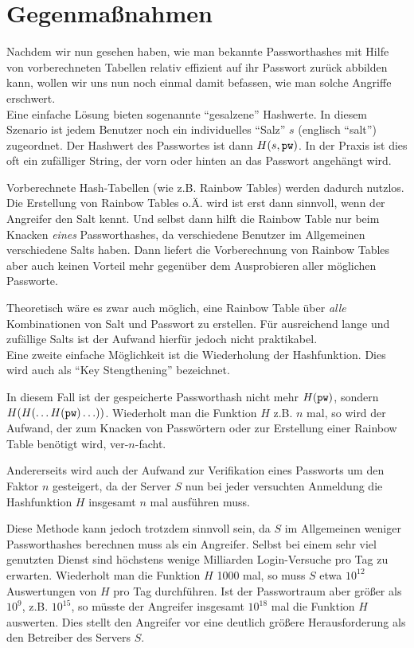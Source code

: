 \section{Gegenmaßnahmen}

Nachdem wir nun gesehen haben, wie man bekannte Passworthashes mit Hilfe von vorberechneten Tabellen relativ effizient auf ihr Passwort zurück abbilden kann, wollen wir uns nun noch einmal damit befassen, wie man solche Angriffe erschwert.\\

Eine einfache Lösung bieten sogenannte "`gesalzene"' Hashwerte. In diesem Szenario ist jedem Benutzer noch ein individuelles "`Salz"' $s$ (englisch "`salt"') zugeordnet. Der Hashwert des Passwortes ist dann $H(s, \texttt{pw})$. In der Praxis ist dies oft ein zufälliger String, der vorn oder hinten an das Passwort angehängt wird.

Vorberechnete Hash-Tabellen (wie z.B. Rainbow Tables) werden dadurch nutzlos. Die Erstellung von Rainbow Tables o.Ä. wird ist erst dann sinnvoll, wenn der Angreifer den Salt kennt. Und selbst dann hilft die Rainbow Table nur beim Knacken \emph{eines} Passworthashes, da verschiedene Benutzer im Allgemeinen verschiedene Salts haben. Dann liefert die Vorberechnung von Rainbow Tables aber auch keinen Vorteil mehr gegenüber dem Ausprobieren aller möglichen Passworte.

Theoretisch wäre es zwar auch möglich, eine Rainbow Table über \emph{alle} Kombinationen von Salt und Passwort zu erstellen. Für ausreichend lange und zufällige Salts ist der Aufwand hierfür jedoch nicht praktikabel.\\

Eine zweite einfache Möglichkeit ist die Wiederholung der Hashfunktion. Dies wird auch als "`Key Stengthening"' bezeichnet.

In diesem Fall ist der gespeicherte Passworthash nicht mehr $H(\texttt{pw})$, sondern $H(H(\ldots H(\texttt{pw})\ldots))$. Wiederholt man die Funktion $H$ z.B. $n$ mal, so wird der Aufwand, der zum Knacken von Passwörtern oder zur Erstellung einer Rainbow Table benötigt wird, ver-$n$-facht.

Andererseits wird auch der Aufwand zur Verifikation eines Passworts um den Faktor $n$ gesteigert, da der Server $S$ nun bei jeder versuchten Anmeldung die Hashfunktion $H$ insgesamt $n$ mal ausführen muss.

Diese Methode kann jedoch trotzdem sinnvoll sein, da $S$ im Allgemeinen weniger Passworthashes berechnen muss als ein Angreifer. Selbst bei einem sehr viel genutzten Dienst sind höchstens wenige Milliarden Login-Versuche pro Tag zu erwarten. Wiederholt man die Funktion $H$ 1000 mal, so muss $S$ etwa $10^{12}$ Auswertungen von $H$ pro Tag durchführen. Ist der Passwortraum aber größer als $10^9$, z.B. $10^{15}$, so müsste der Angreifer insgesamt $10^{18}$ mal die Funktion $H$ auswerten. Dies stellt den Angreifer vor eine deutlich größere Herausforderung als den Betreiber des Servers $S$.

